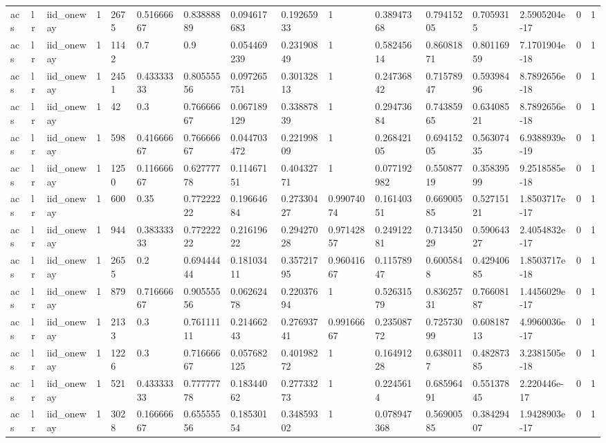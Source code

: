 \begin{tabular}{llllllllllllllll}
acs & lr & iid\_oneway & 1 & 2675 & 0.51666667 & 0.83888889 & 0.094617683 & 0.19265933 & 1 & 0.38947368 & 0.79415205 & 0.7059315 & 2.5905204e-17 & 0 & 1 \\
acs & lr & iid\_oneway & 1 & 1142 & 0.7 & 0.9 & 0.054469239 & 0.23190849 & 1 & 0.58245614 & 0.86081871 & 0.80116959 & 7.1701904e-18 & 0 & 1 \\
acs & lr & iid\_oneway & 1 & 2451 & 0.43333333 & 0.80555556 & 0.097265751 & 0.30132813 & 1 & 0.24736842 & 0.71578947 & 0.59398496 & 8.7892656e-18 & 0 & 1 \\
acs & lr & iid\_oneway & 1 & 42 & 0.3 & 0.76666667 & 0.067189129 & 0.33887839 & 1 & 0.29473684 & 0.74385965 & 0.63408521 & 8.7892656e-18 & 0 & 1 \\
acs & lr & iid\_oneway & 1 & 598 & 0.41666667 & 0.76666667 & 0.044703472 & 0.22199809 & 1 & 0.26842105 & 0.69415205 & 0.56307435 & 6.9388939e-19 & 0 & 1 \\
acs & lr & iid\_oneway & 1 & 1250 & 0.11666667 & 0.62777778 & 0.11467151 & 0.40432771 & 1 & 0.077192982 & 0.55087719 & 0.35839599 & 9.2518585e-18 & 0 & 1 \\
acs & lr & iid\_oneway & 1 & 600 & 0.35 & 0.77222222 & 0.19664684 & 0.27330427 & 0.99074074 & 0.16140351 & 0.66900585 & 0.52715121 & 1.8503717e-17 & 0 & 1 \\
acs & lr & iid\_oneway & 1 & 944 & 0.38333333 & 0.77222222 & 0.21619622 & 0.29427028 & 0.97142857 & 0.24912281 & 0.71345029 & 0.59064327 & 2.4054832e-17 & 0 & 1 \\
acs & lr & iid\_oneway & 1 & 2655 & 0.2 & 0.69444444 & 0.18103411 & 0.35721795 & 0.96041667 & 0.11578947 & 0.6005848 & 0.42940685 & 1.8503717e-18 & 0 & 1 \\
acs & lr & iid\_oneway & 1 & 879 & 0.71666667 & 0.90555556 & 0.06262478 & 0.22037694 & 1 & 0.52631579 & 0.83625731 & 0.76608187 & 1.4456029e-17 & 0 & 1 \\
acs & lr & iid\_oneway & 1 & 2133 & 0.3 & 0.76111111 & 0.21466243 & 0.27693741 & 0.99166667 & 0.23508772 & 0.72573099 & 0.60818713 & 4.9960036e-17 & 0 & 1 \\
acs & lr & iid\_oneway & 1 & 1226 & 0.3 & 0.71666667 & 0.057682125 & 0.40198272 & 1 & 0.16491228 & 0.6380117 & 0.48287385 & 3.2381505e-18 & 0 & 1 \\
acs & lr & iid\_oneway & 1 & 521 & 0.43333333 & 0.77777778 & 0.18344062 & 0.27733273 & 1 & 0.2245614 & 0.68596491 & 0.55137845 & 2.220446e-17 & 0 & 1 \\
acs & lr & iid\_oneway & 1 & 3028 & 0.16666667 & 0.65555556 & 0.18530154 & 0.34859302 & 1 & 0.078947368 & 0.56900585 & 0.38429407 & 1.9428903e-17 & 0 & 1 \\

\end{tabular}
